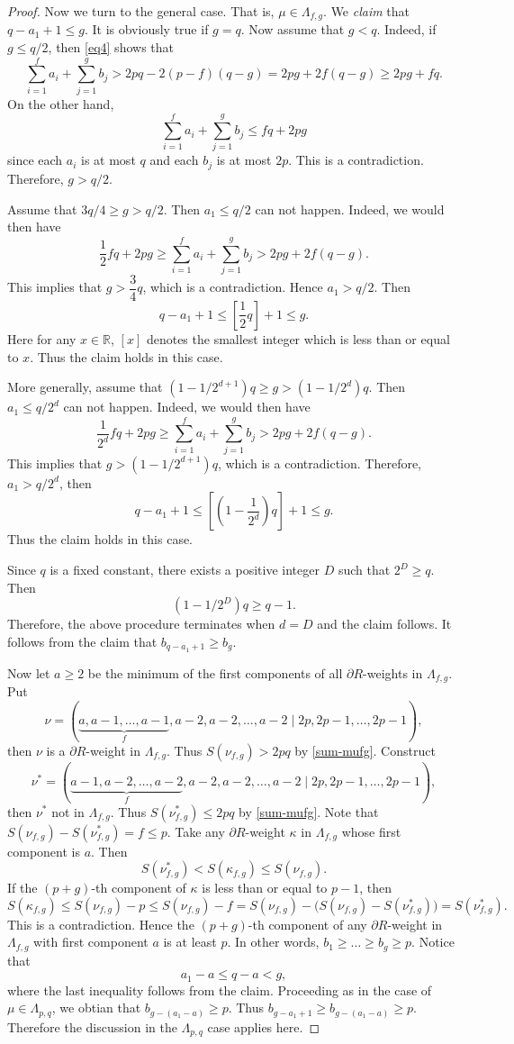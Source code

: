 \documentclass[11pt]{amsart}
\theoremstyle{plain}
\theoremstyle{definition}
\newcommand{\bbR}{\mathbb{R}}
\begin{document}
\begin{proof}
	Now we turn to the general case. That is, $\mu\in \Lambda_{f, g}$. We \emph{claim} that $q-a_1+1\le g$. It is obviously true if $g=q$. Now assume that $g<q$.
	Indeed, if $g \le q/2$, then \eqref{eq4} shows that
	\[\sum_{i=1}^f a_i+\sum_{j=1}^g b_j>2pq-2(p-f)(q-g) = 2pg+2f(q-g)\ge 2pg+fq.\]
On the other hand,
$$
\sum_{i=1}^f a_i+\sum_{j=1}^g b_j\leq fq+2pg
$$
since each $a_i$ is at most $q$ and each $b_j$ is at most $2p$. This is a contradiction. Therefore, $g>q/2$.
	
	Assume that $3q/4\ge g>q/2$. Then $a_1\le q/2$ can not happen. Indeed, we would then have
	\[\dfrac{1}{2}fq+2pg \ge \sum_{i=1}^f a_i+\sum_{j=1}^g b_j >2pg+2f(q-g).\]
	This implies that $g>\dfrac{3}{4}q$, which is a contradiction. Hence $a_1>q/2$. Then
	\[q-a_1+1\leq\left[\dfrac{1}{2}q \right]+1\le g.\]
	Here for any $x\in\bbR$, $[x]$ denotes the smallest integer which is less than or equal to $x$. Thus the claim holds in this case.
	
	More generally, assume that $(1-1/2^{d+1})q\ge g>(1-1/2^d)q$. Then $a_1\le q/2^d$ can not happen. Indeed, we would then have
	\[\dfrac{1}{2^{d}}fq+2pg\ge \sum_{i=1}^f a_i+\sum_{j=1}^g b_j>2pg+2f(q-g).\]
	This implies that
	$g>(1-1/2^{d+1})q$, which is a contradiction.
	Therefore, $a_1>q/2^{d}$, then
	\[q-a_1+1\le \left[(1-\dfrac{1}{2^d})q \right]+1\le g.\]
	Thus the claim holds in this case.

Since $q$ is a fixed constant, there exists a positive integer $D$ such that $2^D\ge q$. Then
$$
(1-1/2^D)q\ge q-1.
$$
Therefore, the above procedure terminates when $d=D$ and the claim follows. It follows from the claim that $b_{q-a_1+1}\ge b_g$.
	
	Now let $a\ge 2$ be the minimum of the first components of all $\partial R$-weights in $\Lambda_{f,g}$. Put
	\[\nu=(\underbrace{a,a-1,\dots,a-1}_{f},a-2,a-2,\dots,a-2 \mid 2p,2p-1,\dots,2p-1),\]
	then $\nu$ is a $\partial R$-weight in $\Lambda_{f,g}$. Thus $S(\nu_{f, g})>2pq$ by \eqref{sum-mufg}. Construct
	\[\nu^*=(\underbrace{a-1,a-2,\dots,a-2}_{f},a-2,a-2,\dots,a-2 \mid 2p,2p-1,\dots,2p-1),\]
	then $\nu^*$ not in $\Lambda_{f,g}$. Thus $S(\nu_{f, g}^*)\leq 2pq$ by \eqref{sum-mufg}. Note that $S(\nu_{f,g})-S(\nu_{f,g}^*) = f\le p$. Take any $\partial R$-weight $\kappa$ in $\Lambda_{f,g}$ whose first component is $a$. Then
	\[S(\nu^*_{f,g}) < S(\kappa_{f,g}) \le S(\nu_{f,g}).\]
If the $(p+g)$-th component of $\kappa$ is less than or equal to $p-1$, then
\[S(\kappa_{f, g})\leq S(\nu_{f,g})-p\leq S(\nu_{f,g})-f=S(\nu_{f,g})-\big(S(\nu_{f,g})-S(\nu_{f,g}^*)\big)=S(\nu_{f,g}^*).\]
This is a contradiction. Hence the $(p+g)$-th component of any $\partial R$-weight in $\Lambda_{f,g}$ with first component $a$ is at least $p$. In other words, $b_1\ge \dots \ge b_g\ge p$.  Notice that
	\[a_1-a\le q-a< g,\]
where the last inequality follows from the claim.
Proceeding as in the case of $\mu\in \Lambda_{p, q}$, we obtian that $b_{g-(a_1-a)}\ge p$. Thus $b_{g-a_1+1}\ge b_{g-(a_1-a)}\ge p$. Therefore the discussion in the $\Lambda_{p, q}$ case applies here.
\end{proof}
\end{document}
